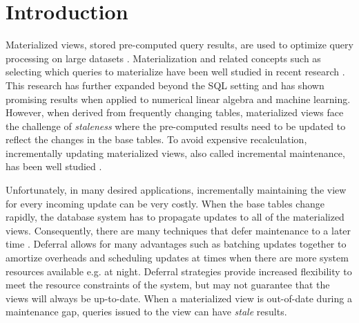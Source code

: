 \section{Introduction}
Materialized views, stored pre-computed query results, are used to optimize query processing on large datasets \cite{gupta1995maintenance, chirkova2011materialized, halevy2001answering}.
Materialization and related concepts such as selecting which queries to materialize
have been well studied in recent research \cite{zaharia2012resilient,lefevre2014opportunistic, bailis2014scalable, perez2014history}.
This research has further expanded beyond the SQL setting \cite{nikolic2014linview} and 
has shown promising results when applied to numerical linear algebra and machine learning.
However, when derived from frequently changing tables,
materialized views face the challenge of \emph{staleness} where the pre-computed results need to be updated to reflect the changes in the base tables.
To avoid expensive recalculation, incrementally updating materialized views,
also called incremental maintenance, has been well studied \cite{gupta1995maintenance, chirkova2011materialized}.

Unfortunately, in many desired applications, incrementally maintaining the view for every incoming update can be very costly. 
When the base tables change rapidly, the database system has to propagate updates to all of the materialized views.
Consequently, there are many techniques that defer maintenance to a later time \cite{chirkova2011materialized, zhou2007lazy}.
Deferral allows for many advantages such as batching updates together to amortize overheads and scheduling updates at times when there are more system resources available e.g. at night.
Deferral strategies provide increased flexibility to meet the resource constraints of the system, but may not guarantee that the views will always be up-to-date.
When a materialized view is out-of-date during a maintenance gap, queries issued to the view can have \emph{stale} results. 

